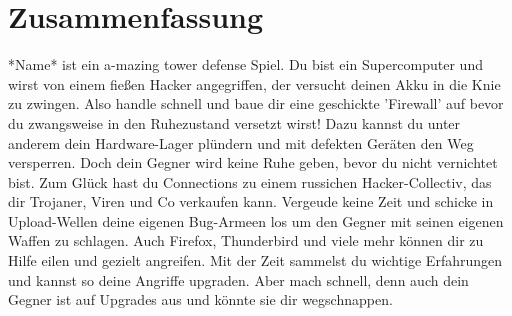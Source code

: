 \section{Zusammenfassung}


*Name* ist ein a-mazing tower defense Spiel.
Du bist ein Supercomputer und wirst von einem fießen Hacker angegriffen, der versucht deinen Akku in die Knie zu zwingen.
Also handle schnell und baue dir eine geschickte 'Firewall' auf bevor du zwangsweise in den Ruhezustand versetzt wirst!
Dazu kannst du unter anderem dein Hardware-Lager plündern und mit defekten Geräten den Weg versperren.
Doch dein Gegner wird keine Ruhe geben, bevor du nicht vernichtet bist.
Zum Glück hast du Connections zu einem russichen Hacker-Collectiv, das dir Trojaner, Viren und Co verkaufen kann. Vergeude keine Zeit und schicke in Upload-Wellen deine eigenen Bug-Armeen los um den Gegner mit seinen eigenen Waffen zu schlagen.
Auch Firefox, Thunderbird und viele mehr können dir zu Hilfe eilen und gezielt angreifen.
Mit der Zeit sammelst du wichtige Erfahrungen und kannst so deine Angriffe upgraden. Aber mach schnell, denn auch dein Gegner ist auf Upgrades aus und könnte sie dir wegschnappen.

